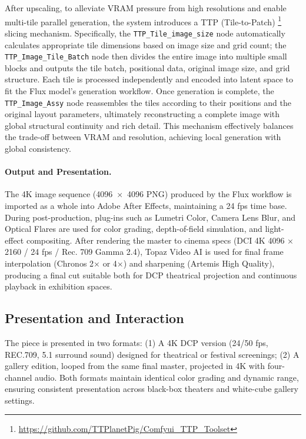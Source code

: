 \documentclass[sigconf,nonacm]{acmart}
\begin{document}
After upscaling, to alleviate VRAM pressure from high resolutions and enable multi-tile parallel generation, the system introduces a TTP (Tile-to-Patch)   \footnote{\url{https://github.com/TTPlanetPig/Comfyui_TTP_Toolset}}  slicing mechanism. Specifically, the \texttt{TTP\_Tile\_image\_size} node automatically calculates appropriate tile dimensions based on image size and grid count; the \texttt{TTP\_Image\_Tile\_Batch} node then divides the entire image into multiple small blocks and outputs the tile batch, positional data, original image size, and grid structure. Each tile is processed independently and encoded into latent space to fit the Flux model's generation workflow.
Once generation is complete, the \texttt{TTP\_Image\_Assy} node reassembles the tiles according to their positions and the original layout parameters, ultimately reconstructing a complete image with global structural continuity and rich detail. This mechanism effectively balances the trade-off between VRAM and resolution, achieving local generation with global consistency.


\paragraph{Output and Presentation.}
The 4K image sequence (4096~$\times$~4096 PNG) produced by the Flux workflow is imported as a whole into Adobe After Effects, maintaining a 24 fps time base. During post-production, plug-ins such as Lumetri Color, Camera Lens Blur, and Optical Flares are used for color grading, depth-of-field simulation, and light-effect compositing.
After rendering the master to cinema specs (DCI 4K 4096 × 2160 / 24 fps / Rec. 709 Gamma 2.4), Topaz Video AI is used for final frame interpolation (Chronos 2$\times$ or 4$\times$) and sharpening (Artemis High Quality), producing a final cut suitable both for DCP theatrical projection and continuous playback in exhibition spaces.

\subsection{Presentation and Interaction}
The piece is presented in two formats:
(1) A 4K DCP version (24/50 fps, REC.709, 5.1 surround sound) designed for theatrical or festival screenings;
(2) A gallery edition, looped from the same final master, projected in 4K with four-channel audio. Both formats maintain identical color grading and dynamic range, ensuring consistent presentation across black-box theaters and white-cube gallery settings.
\end{document}
